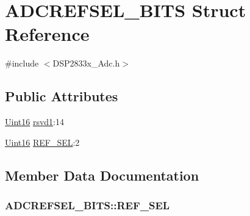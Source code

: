 \hypertarget{struct_a_d_c_r_e_f_s_e_l___b_i_t_s}{}\section{A\+D\+C\+R\+E\+F\+S\+E\+L\+\_\+\+B\+I\+T\+S Struct Reference}
\label{struct_a_d_c_r_e_f_s_e_l___b_i_t_s}


{\ttfamily \#include $<$D\+S\+P2833x\+\_\+\+Adc.\+h$>$}

\subsection*{Public Attributes}
\begin{DoxyCompactItemize}
\item 
\hyperlink{_d_s_p2833x___device_8h_a59a9f6be4562c327cbfb4f7e8e18f08b}{Uint16} \hyperlink{struct_a_d_c_r_e_f_s_e_l___b_i_t_s_a296e6350a08d63842a95c92753093e82}{rsvd1}\+:14
\item 
\hyperlink{_d_s_p2833x___device_8h_a59a9f6be4562c327cbfb4f7e8e18f08b}{Uint16} \hyperlink{struct_a_d_c_r_e_f_s_e_l___b_i_t_s_a96c088ff010b99965ba8c0278d842621}{R\+E\+F\+\_\+\+S\+E\+L}\+:2
\end{DoxyCompactItemize}


\subsection{Member Data Documentation}
\hypertarget{struct_a_d_c_r_e_f_s_e_l___b_i_t_s_a96c088ff010b99965ba8c0278d842621}{}
\subsubsection[{R\+E\+F\+\_\+\+S\+E\+L}]{ A\+D\+C\+R\+E\+F\+S\+E\+L\+\_\+\+B\+I\+T\+S\+::\+R\+E\+F\+\_\+\+S\+E\+L}\label{struct_a_d_c_r_e_f_s_e_l___b_i_t_s_a96c088ff010b99965ba8c0278d842621}
\hypertarget{struct_a_d_c_r_e_f_s_e_l___b_i_t_s_a296e6350a08d63842a95c92753093e82}{}
